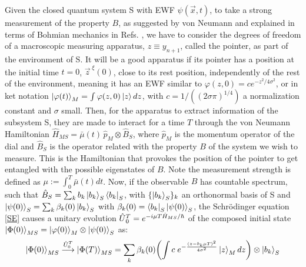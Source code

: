 \documentclass[11pt, a4paper]{article} %
\begin{document}
Given the closed quantum system S with EWF $\psi(\vec{x},t)$, to take a strong measurement of the property $B$, as suggested by von Neumann \cite{vonNeumann} and explained in terms of Bohmian mechanics in Refs. \cite{Durr, JordiXavier, Holland}, we have to consider the degrees of freedom of a macroscopic measuring apparatus, $z\equiv y_{n+1}$, called the pointer, as part of the environment of S. It will be a good apparatus if its pointer has a position at the initial time $t=0$, $\vec{z}^{\;\xi}(0)$, close to its rest position, independently of the rest of the environment, meaning it has an EWF similar to $\varphi(z,0)=c e^{-z^2/4\sigma^2}$, or in ket notation $\ket{\varphi(t)}_M=\int\varphi(z,0) \ket{z}dz$, with $c=1/((2\sigma\pi)^{1/4})$ a normalization constant and $\sigma$ small. Then, for the apparatus to extract information of the subsystem S, they are made to interact for a time $T$ through the von Neumann Hamiltonian $\hat{H}_{MS}=\bar{\mu}(t)\,\hat{p}_M\otimes \hat{B}_S$, where $\hat{p}_M$ is the momentum operator of the dial and $\hat{B}_S$ is the operator related with the property $B$ of the system we wish to measure. This is the Hamiltonian that provokes the position of the pointer to get entangled with the possible eigenstates of $B$. Note the measurement strength is defined as $\mu:=\int_0^T\bar{\mu}(t)dt$. Now, if the observable $B$ has countable spectrum, such that $\hat{B}_S=\sum_k b_k \ket{b_k}_S\bra{b_k}_S$, with $\{\ket{b_k}_S\}_k$ an orthonormal basis of S and $\ket{\psi(0)}_S=\sum_k \beta_k(0)\ket{b_k}_S$ with $\beta_k(0)=\bra{b_k}_S\ket{\psi(0)}_S$, the Schrödinger equation \eqref{SE} causes a unitary evolution $\hat{U} \null_{0}^T=e^{-i\mu T \hat{H}_{MS}/\hbar}$ of the composed initial state $\ket{\Phi(0)}_{MS}=\ket{\varphi(0)}_M\otimes\ket{\psi(0)}_S$ as:\vspace{-0.15cm}
\begin{equation}\label{postM1}
\ket{\Phi(0)}_{MS} \overset{\hat{U}_{0}^T}{\longrightarrow} \ket{\Phi(T)}_{MS}=\sum_k \beta_k(0)\qty(\int c \; e^{-\frac{(z-b_k\mu T)^2}{4\sigma^2}}\ket{z}_M dz )\otimes \ket{b_k}_S \vspace{-0.15cm}
\end{equation}
\end{document}

